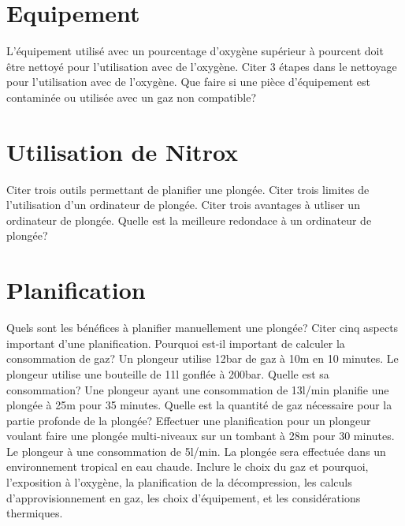 \documentclass[english,10pt,a4paper]{article}
\begin{document}
	\section{Equipement}
	\begin{outline}
		\1 L'équipement utilisé avec un pourcentage d'oxygène supérieur à \underline{\hspace{1.5cm}} pourcent doit être nettoyé pour l'utilisation avec de l'oxygène.
		\1 Citer 3 étapes dans le nettoyage pour l'utilisation avec de l'oxygène.
		\1 Que faire si une pièce d'équipement est contaminée ou utilisée avec un gaz non compatible?
	\end{outline}
	\pagebreak

	\section{Utilisation de Nitrox}
	\begin{outline}
		\1 Citer trois outils permettant de planifier une plongée.
		\1 Citer trois limites de l'utilisation d'un ordinateur de plongée.
		\1 Citer trois avantages à utliser un ordinateur de plongée.
		\1 Quelle est la meilleure redondace à un ordinateur de plongée?
	\end{outline}
	\pagebreak

	\section{Planification}
	\begin{outline}
		\1 Quels sont les bénéfices à planifier manuellement une plongée?
		\1 Citer cinq aspects important d'une planification.
		\1 Pourquoi est-il important de calculer la consommation de gaz?
		\1 Un plongeur utilise 12bar de gaz à 10m en 10 minutes. Le plongeur utilise une bouteille de 11l gonflée à 200bar. Quelle est sa consommation?
		\1 Une plongeur ayant une consommation de 13l/min planifie une plongée à 25m pour 35 minutes. Quelle est la quantité de gaz nécessaire pour la partie profonde de la plongée?
		\1 Effectuer une planification pour un plongeur voulant faire une plongée multi-niveaux sur un tombant à 28m pour 30 minutes. Le plongeur à une consommation de 5l/min. La plongée sera effectuée dans un environnement tropical en eau chaude. Inclure le choix du gaz et pourquoi, l'exposition à l'oxygène, la planification de la décompression, les calculs d'approvisionnement en gaz, les choix d'équipement, et les considérations thermiques.
	\end{outline}
	\pagebreak
\end{document}
